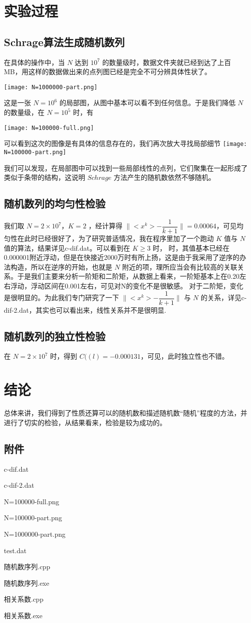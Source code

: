 \documentclass[11pt,a4paper,titlepage,openany]{book}
\begin{document}
\chapter{实验过程}
\section{Schrage算法生成随机数列}
在具体的操作中，当 $N$ 达到 $10^{7}$ 的数量级时，数据文件夹就已经到达了上百MB，用这样的数据做出来的点列图已经是完全不可分辨具体性状了。\par
\texttt{[image: N=1000000-part.png]}\par
这是一张 $N=10^{6}$ 的局部图，从图中基本可以看不到任何信息。于是我们降低 $N$ 的数量级，在 $N=10^{5}$ 时，有\par
\texttt{[image: N=100000-full.png]}\par
可以看到这次的图像是有具体的信息存在的，我们再次放大寻找局部细节
\texttt{[image: N=100000-part.png]}\par
我们可以发现，在局部图中可以找到一些局部线性的点列，它们聚集在一起形成了类似于条带的结构，这说明 $Schrage$ 方法产生的随机数依然不够随机。
\section{随机数列的均匀性检验}
我们取 $N=2\times 10^{7}$，$K=2$ ，经计算得 $\|<x^{k}>-\dfrac{1}{k+1}\|=0.00064$，可见均匀性在此时已经很好了，为了研究普适情况，我在程序里加了一个跑动 $K$ 值与 $N$ 值的算法，结果详见c-dif.dat。可以看到在 $K\geqslant 3$ 时， 时，其值基本已经在0.000001附近浮动，但是在快接近2000万时有所上扬，这是由于我采用了逆序的办法构造，所以在逆序的开始，也就是 $N$ 附近的项，理所应当会有比较高的关联关系。于是我们主要来分析一阶矩和二阶矩，从数据上看来，一阶矩基本上在0.20左右浮动，浮动区间在0.001左右，可见对N的变化不是很敏感。
对于二阶矩，变化是很明显的。为此我们专门研究了一下 $\|<x^{k}>-\dfrac{1}{k+1}\|$ 与 $N$ 的关系，详见c-dif-2.dat，其实也可以看出来，线性关系并不是很明显.
\section{随机数列的独立性检验}
在 $N=2\times 10^{7}$ 时，得到 $C((l)=-0.000131$，可见，此时独立性也不错。
\chapter{结论}
总体来讲，我们得到了性质还算可以的随机数和描述随机数“随机”程度的方法，并进行了切实的检验，从结果看来，检验是较为成功的。
\section{附件}
c-dif.dat\par
c-dif-2.dat\par
N=100000-full.png\par
N=100000-part.png\par
N=1000000-part.png\par
test.dat\par
随机数序列.cpp\par
随机数序列.exe\par
相关系数.cpp\par
相关系数.exe\par
\end{document}
